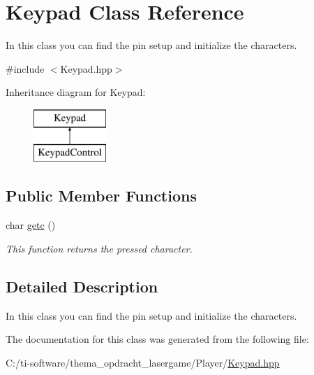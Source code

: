 \hypertarget{class_keypad}{}\section{Keypad Class Reference}
\label{class_keypad}


In this class you can find the pin setup and initialize the characters.  




{\ttfamily \#include $<$Keypad.\+hpp$>$}

Inheritance diagram for Keypad\+:\begin{figure}[H]
\begin{center}
\leavevmode
\includegraphics[height=2.000000cm]{class_keypad}
\end{center}
\end{figure}
\subsection*{Public Member Functions}
\begin{DoxyCompactItemize}
\item 
\mbox{\label{class_keypad_ade2df731c6751f21bbf745b276cb7208}} 
char \mbox{\hyperlink{class_keypad_ade2df731c6751f21bbf745b276cb7208}{getc}} ()
\begin{DoxyCompactList}\small\item\em This function returns the pressed character. \end{DoxyCompactList}\end{DoxyCompactItemize}


\subsection{Detailed Description}
In this class you can find the pin setup and initialize the characters. 

The documentation for this class was generated from the following file\+:\begin{DoxyCompactItemize}
\item 
C\+:/ti-\/software/thema\+\_\+opdracht\+\_\+lasergame/\+Player/\mbox{\hyperlink{_keypad_8hpp}{Keypad.\+hpp}}\end{DoxyCompactItemize}
